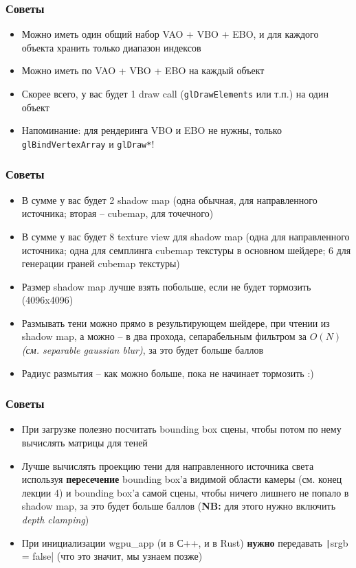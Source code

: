 \documentclass[10pt]{beamer}
\begin{document}
\begin{frame}[fragile]
\frametitle{Советы}
\begin{itemize}
\item Можно иметь один общий набор VAO + VBO + EBO, и для каждого объекта хранить только диапазон индексов
\item Можно иметь по VAO + VBO + EBO на каждый объект
\item Скорее всего, у вас будет 1 draw call (\verb|glDrawElements| или т.п.) на один объект
\item Напоминание: для рендеринга VBO и EBO не нужны, только \verb|glBindVertexArray| и \verb|glDraw*|!
\end{itemize}
\end{frame}

\begin{frame}[fragile]
\frametitle{Советы}
\begin{itemize}
\item В сумме у вас будет 2 shadow map (одна обычная, для направленного источника; вторая -- cubemap, для точечного)
\item В сумме у вас будет 8 texture view для shadow map (одна для направленного источника; одна для семплинга cubemap текстуры в основном шейдере; 6 для генерации граней cubemap текстуры)
\item Размер shadow map лучше взять побольше, если не будет тормозить (4096x4096)
\item Размывать тени можно прямо в результирующем шейдере, при чтении из shadow map, а можно -- в два прохода, сепарабельным фильтром за \begin{math}O(N)\end{math} \textit{(см. separable gaussian blur)}, за это будет больше баллов
\item Радиус размытия -- как можно больше, пока не начинает тормозить :)
\end{itemize}
\end{frame}

\begin{frame}[fragile]
\frametitle{Советы}
\begin{itemize}
\item При загрузке полезно посчитать bounding box сцены, чтобы потом по нему вычислять матрицы для теней
\item Лучше вычислять проекцию тени для направленного источника света используя \textbf{пересечение} bounding box'а видимой области камеры (см. конец лекции 4) и bounding box'а самой сцены, чтобы ничего лишнего не попало в shadow map, за это будет больше баллов (\textbf{NB:} для этого нужно включить \textit{depth clamping})
\item При инициализации wgpu\_app (и в С++, и в Rust) \textbf{нужно} передавать \texttt|srgb = false| (что это значит, мы узнаем позже)
\end{itemize}
\end{frame}
\end{document}
